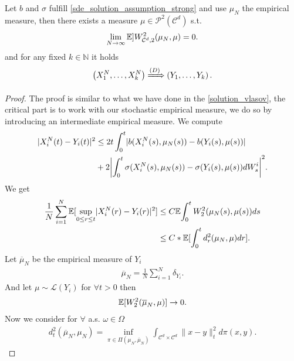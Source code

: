 \begin{theorem}
  Let $b$ and $\sigma$ fulfill \autoref{sde_solution_assumption_strong} and use 
  $\mu_N$ the empirical measure, then there exists a measure $\mu \in \mathcal{P}^2(\mathcal{C}^{d} )$ s.t. 
  \begin{align*}
    \lim_{N\to \infty}\E]W_{\mathcal{C}^{d},2 }^2(\mu_N,\mu ) = 0
  .\end{align*}
  and for any fixed $k \in  \mathbb{N}$ it holds
  \begin{align*}
    \left( X^{N}_1,\ldots ,X_k^{N}   \right)  \xRightarrow{(D)} \left( Y_{1},\ldots ,Y_{k}   \right) 
  .\end{align*}
\end{theorem}
\begin{proof}
  The proof is similar to what we have done in the \autoref{solution_vlasov}, the critical part is to 
  work with our stochastic empirical measure, we do so by introducing an intermediate empirical measure. We compute 
  \begin{align*}
    \abs{X_i^{N}(t) - Y_i(t) }^2 &\le 2 t \int_0^{t} \abs{b(X^{N}_i(s),\mu_N(s) ) -  b(Y_i(s),\mu(s) )} \\
    &+ 2 \abs*{\int_0^{t} \sigma(X_i^{N}(s),\mu_N(s) ) - \sigma(Y_i(s),\mu(s))  dW_s^{i} }^2
  .\end{align*}
   We get %
  \begin{align*}
    \frac{1}{N}\sum_{i=1}^{N} \mathbb{E}[\sup_{0\le r\le t} \lvert X_i^{N}(r) - Y_i(r) \rvert^2] &\le C \mathbb{E}{\int_0^{t} W_2^{2}(\mu_N(s),\mu(s))  } ds\\
                                                        &\le  C*\mathbb{E}[\int_0^{t} d_r^2(\mu_N,\mu ) dr]
  .\end{align*}
  Let $\overline{\mu }_N $ be the empirical measure of $Y_i$ 
  \begin{align*}
    \overline{\mu }_N = \frac{1}{N} \sum_{i=1}^{N} \delta_{Y_i}  
  .\end{align*}
  And let $\mu \sim \mathcal{L}(Y_i)$ for $\forall  t > 0$ then 
  \begin{align*}
    \mathbb{E}[W_2^2(\overline{\mu }_N,\mu  )] \to  0
  .\end{align*}
  Now we consider for $\forall $ a.s. $\omega  \in  \Omega $
  \begin{align*}
    d_t^2(\overline{\mu }_N,\mu_N ) = \inf_{\pi  \in  \Pi(\mu_N,\overline{\mu }_N )} \int_{\mathcal{C}^{d} \times  \mathcal{C}^{d}  } \|x-y\|^2_t d\pi(x,y) 
  .\end{align*}

\end{proof}
